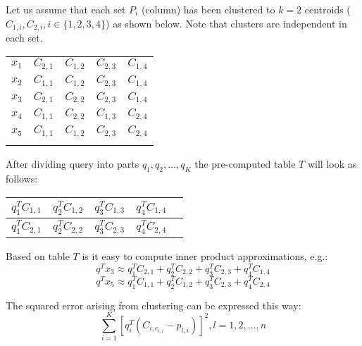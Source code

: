 Let us assume that each set $P_i$ (column) has been clustered to $k=2$ centroids ($C_{1,i}, C_{2,i}, i \in \{1,2,3,4\}$) as shown below. Note that clusters are independent in each set.
\begin{center}
\renewcommand{\arraystretch}{1.2}
\begin{tabular}{c|c|c|c|c|}
\hhline{~----}
$x_1$ & $C_{2,1}$ & $C_{1,2}$ & $C_{2,3}$ & $C_{1,4}$ \\
\hhline{~----}
$x_2$ & $C_{1,1}$ & $C_{1,2}$ & $C_{2,3}$ & $C_{1,4}$ \\
\hhline{~----}
$x_3$ & $C_{2,1}$ & $C_{2,2}$ & $C_{2,3}$ & $C_{1,4}$ \\
\hhline{~----}
$x_4$ & $C_{1,1}$ & $C_{2,2}$ & $C_{1,3}$ & $C_{2,4}$ \\
\hhline{~----}
$x_5$ & $C_{1,1}$ & $C_{1,2}$ & $C_{2,3}$ & $C_{2,4}$ \\
\hhline{~----}
\end{tabular}
\end{center}

\smallskip

After dividing query into parts $q_1, q_2, \ldots, q_K$ the pre-computed table $T$ will look as follows:
\renewcommand{\arraystretch}{1.6}
\begin{center}
\begin{tabular}{|c|c|c|c|c|}
\hline
$ q_1^T C_{1,1} $ & $ q_2^T C_{1,2} $ & $ q_3^T C_{1,3} $ & $ q_4^T C_{1,4} $ \\
\hline
$ q_1^T C_{2,1} $ & $ q_2^T C_{2,2} $ & $ q_3^T C_{2,3} $ & $ q_4^T C_{2,4} $\\
\hline
\end{tabular}
\end{center}

\smallskip

Based on table $T$ is it easy to compute inner product approximations, e.g.:
\[ q^T x_3 \approx q_1^T C_{2,1} + q_2^T C_{2,2} + q_3^T C_{2,3} + q_4^T C_{1,4} \]
\[ q^T x_5 \approx q_1^T C_{1,1} + q_2^T C_{1,2} + q_3^T C_{2,3} + q_4^T C_{2,4} \]

The squared error arising from clustering can be expressed this way:
$$ \sum_{i=1}^{K}  [q_{i}^{T} (C_{i, c_{i,l}} - p_{l,i})]^2, l = 1, 2, \ldots, n$$
